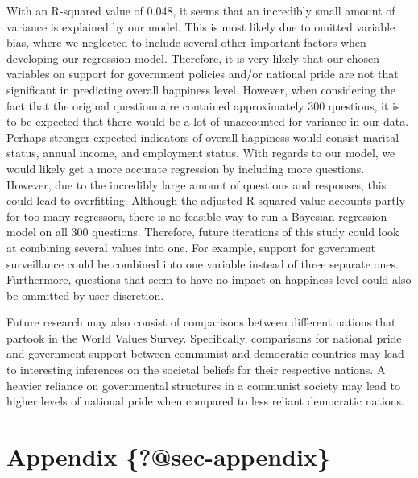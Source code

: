 \documentclass[
  letterpaper,
  DIV=11,
  numbers=noendperiod]{scrartcl}
\begin{document}
With an R-squared value of 0.048, it seems that an incredibly small
amount of variance is explained by our model. This is most likely due to
omitted variable bias, where we neglected to include several other
important factors when developing our regression model. Therefore, it is
very likely that our chosen variables on support for government policies
and/or national pride are not that significant in predicting overall
happiness level. However, when considering the fact that the original
questionnaire contained approximately 300 questions, it is to be
expected that there would be a lot of unaccounted for variance in our
data. Perhaps stronger expected indicators of overall happiness would
consist marital status, annual income, and employment status. With
regards to our model, we would likely get a more accurate regression by
including more questions. However, due to the incredibly large amount of
questions and responses, this could lead to overfitting. Although the
adjusted R-squared value accounts partly for too many regressors, there
is no feasible way to run a Bayesian regression model on all 300
questions. Therefore, future iterations of this study could look at
combining several values into one. For example, support for government
surveillance could be combined into one variable instead of three
separate ones. Furthermore, questions that seem to have no impact on
happiness level could also be ommitted by user discretion.

Future research may also consist of comparisons between different
nations that partook in the World Values Survey. Specifically,
comparisons for national pride and government support between communist
and democratic countries may lead to interesting inferences on the
societal beliefs for their respective nations. A heavier reliance on
governmental structures in a communist society may lead to higher levels
of national pride when compared to less reliant democratic nations.

\newpage

\appendix

\hypertarget{appendix-sec-appendix}{%
\section{\texorpdfstring{Appendix
\{\textbf{?@sec-appendix}\}}{Appendix \{?@sec-appendix\}}}\label{appendix-sec-appendix}}
\end{document}
